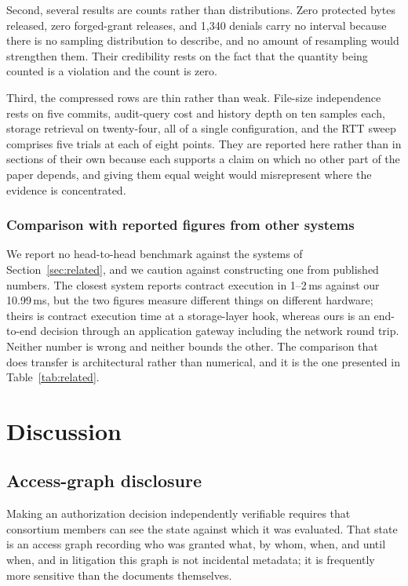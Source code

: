 \documentclass[preprint,12pt]{elsarticle}
\begin{document}
Second, several results are counts rather than distributions. Zero protected
bytes released, zero forged-grant releases, and 1{,}340 denials carry no
interval because there is no sampling distribution to describe, and no amount
of resampling would strengthen them. Their credibility rests on the fact that
the quantity being counted is a violation and the count is zero.

Third, the compressed rows are thin rather than weak. File-size independence
rests on five commits, audit-query cost and history depth on ten samples each,
storage retrieval on twenty-four, all of a single configuration, and the RTT
sweep comprises five trials at each of eight points. They are reported here rather than in sections of their own
because each supports a claim on which no other part of the paper depends, and
giving them equal weight would misrepresent where the evidence is
concentrated.

\subsubsection*{Comparison with reported figures from other systems}

We report no head-to-head benchmark against the systems of
Section~\ref{sec:related}, and we caution against constructing one from
published numbers. The closest system reports contract execution in 1--2\,ms
against our 10.99\,ms, but the two figures measure different things on
different hardware; theirs is contract execution time at a storage-layer hook,
whereas ours is an end-to-end decision through an application gateway
including the network round trip. Neither number is wrong and neither bounds
the other. The comparison that does transfer is architectural rather than
numerical, and it is the one presented in Table~\ref{tab:related}.


\section{Discussion}
\label{sec:discussion}

\subsection{Access-graph disclosure}
\label{sec:accessgraph}

Making an authorization decision independently verifiable requires that
consortium members can see the state against which it was evaluated. That
state is an access graph recording who was granted what, by whom, when, and
until when, and in litigation this graph is not incidental metadata; it is
frequently more sensitive than the documents themselves.
\end{document}
